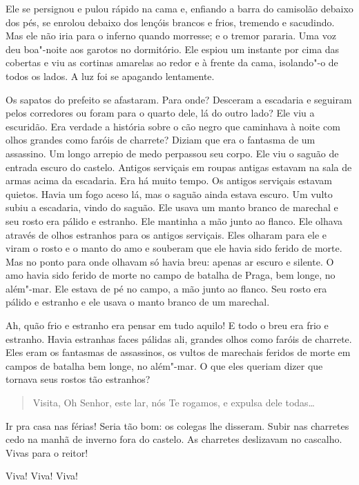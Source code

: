 Ele se persignou e pulou rápido na cama e, enfiando a barra do camisolão
debaixo dos pés, se enrolou debaixo dos lençóis brancos e frios,
tremendo e sacudindo. Mas ele não iria para o inferno quando morresse;
e o tremor pararia. Uma voz deu boa"-noite aos garotos no dormitório.
Ele espiou um instante por cima das cobertas e viu as cortinas amarelas
ao redor e à frente da cama, isolando"-o de todos os lados. A luz foi se
apagando lentamente.

Os sapatos do prefeito se afastaram. Para onde? Desceram a escadaria e
seguiram pelos corredores ou foram para o quarto dele, lá do outro
lado? Ele viu a escuridão. Era verdade a história sobre o cão negro que
caminhava à noite com olhos grandes como faróis de charrete? Diziam que
era o fantasma de um assassino. Um longo arrepio de medo perpassou
seu corpo. Ele viu o saguão de entrada escuro do castelo. Antigos
serviçais em roupas antigas estavam na sala de armas acima da
escadaria. Era há muito tempo. Os antigos serviçais estavam quietos.
Havia um fogo aceso lá, mas o saguão ainda estava escuro. Um vulto
subiu a escadaria, vindo do saguão. Ele usava um manto branco de
marechal e seu rosto era pálido e estranho. Ele mantinha a mão junto ao
flanco. Ele olhava através de olhos estranhos para os antigos
serviçais. Eles olharam para ele e viram o rosto e o manto do amo e
souberam que ele havia sido ferido de morte. Mas no ponto para onde
olhavam só havia breu: apenas ar escuro e silente. O amo havia sido
ferido de morte no campo de batalha de Praga, bem longe, no além"-mar.
Ele estava de pé no campo, a mão junto ao flanco. Seu rosto era pálido
e estranho e ele usava o manto branco de um marechal.

Ah, quão frio e estranho era pensar em tudo aquilo! E todo o breu era
frio e estranho. Havia estranhas faces pálidas ali, grandes olhos como
faróis de charrete. Eles eram os fantasmas de assassinos, os vultos de
marechais feridos de morte em campos de batalha bem longe, no além"-mar.
O que eles queriam dizer que tornava seus rostos tão estranhos?

\begin{quote}
Visita, Oh Senhor, este lar, nós Te rogamos, e expulsa dele
todas\ldots{}

\end{quote}
Ir pra casa nas férias! Seria tão bom: os colegas lhe disseram. Subir
nas charretes cedo na manhã de inverno fora do castelo. As charretes
deslizavam no cascalho. Vivas para o reitor!

Viva! Viva! Viva!

